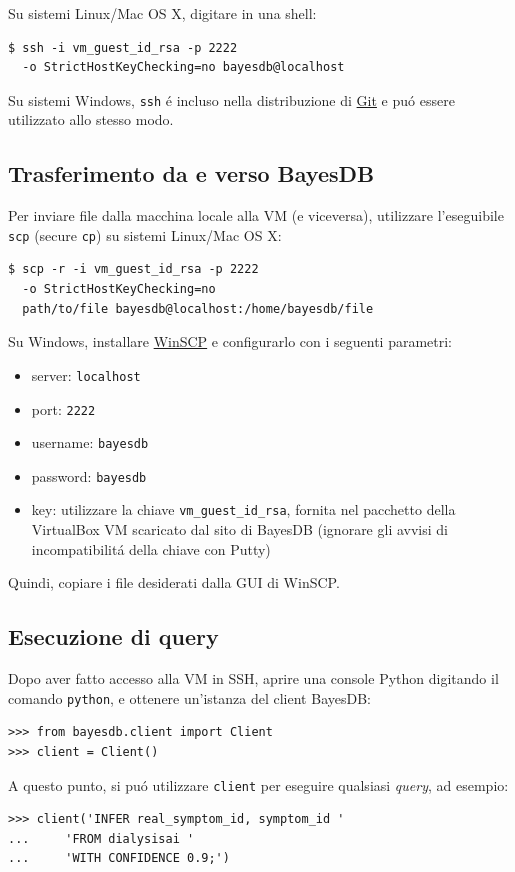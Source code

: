 \documentclass[preprint]{acm_proc_article-sp}
\begin{document}
Su sistemi Linux/Mac OS X, digitare in una shell:
\begin{verbatim}
$ ssh -i vm_guest_id_rsa -p 2222 
  -o StrictHostKeyChecking=no bayesdb@localhost
\end{verbatim}

Su sistemi Windows, \verb|ssh| \'e incluso nella distribuzione di \href{http://git-scm.com/}{Git} e pu\'o essere utilizzato allo stesso modo.

\subsection{Trasferimento da e verso BayesDB}
\label{appendix-bayesdb-trasferimento}
Per inviare file dalla macchina locale alla VM (e viceversa), utilizzare l'eseguibile \verb|scp| (secure \verb|cp|) su sistemi Linux/Mac OS X:
\begin{verbatim}
$ scp -r -i vm_guest_id_rsa -p 2222 
  -o StrictHostKeyChecking=no 
  path/to/file bayesdb@localhost:/home/bayesdb/file
\end{verbatim}

Su Windows, installare \href{http://winscp.net/eng/index.php}{WinSCP} e configurarlo con i seguenti parametri:
\begin{itemize}
\item server: \verb|localhost|
\item port: \verb|2222|
\item username: \verb|bayesdb|
\item password: \verb|bayesdb|
\item key: utilizzare la chiave \verb|vm_guest_id_rsa|, fornita nel pacchetto della VirtualBox VM scaricato dal sito di BayesDB (ignorare gli avvisi di incompatibilit\'a della chiave con Putty)
\end{itemize}

Quindi, copiare i file desiderati dalla GUI di WinSCP.

\subsection{Esecuzione di query}
\label{appendix-bayesdb-query}
Dopo aver fatto accesso alla VM in SSH, aprire una console Python digitando il comando \verb|python|, e ottenere un'istanza del client BayesDB:
\begin{verbatim}
>>> from bayesdb.client import Client
>>> client = Client()
\end{verbatim}
A questo punto, si pu\'o utilizzare \verb|client| per eseguire qualsiasi \textit{query}, ad esempio:
\begin{verbatim}
>>> client('INFER real_symptom_id, symptom_id '
...     'FROM dialysisai '
...     'WITH CONFIDENCE 0.9;')
\end{verbatim}

\balancecolumns

\end{document}
